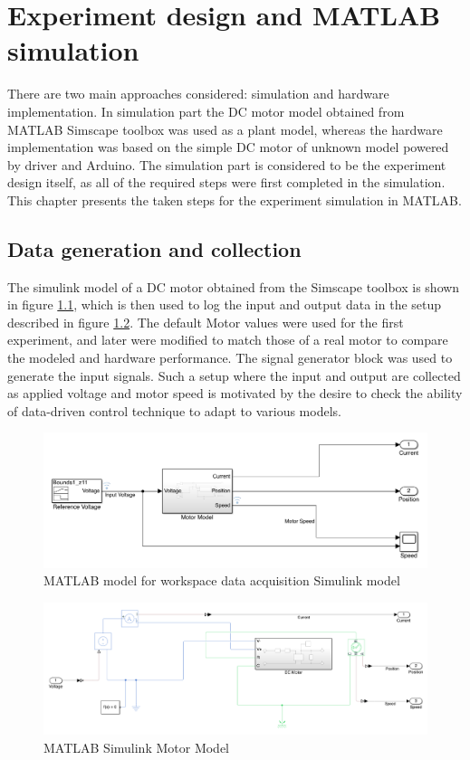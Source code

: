 \documentclass[]{final_report}
\begin{document}
\chapter{Experiment design and MATLAB simulation}

There are two main approaches considered: simulation and hardware implementation. In simulation part the DC motor model obtained from MATLAB Simscape toolbox was used as a plant model, whereas the hardware implementation was based on the simple DC motor of unknown model powered by driver and Arduino. The simulation part is considered to be the experiment design itself, as all of the required steps were first completed in the simulation. This chapter presents the taken steps for the experiment simulation in MATLAB.

\section{Data generation and collection}
The simulink model of a DC motor obtained from the Simscape toolbox is shown in figure \ref{fig:MatlabMotorModelAT1}, which is then used to log the input and output data in the setup described in figure \ref{fig:MatlabMotorModel}. The default Motor values were used for the first experiment, and later were modified to match those of a real motor to compare the modeled and hardware performance. The signal generator block was used to generate the input signals. Such a setup where the input and output are collected as applied voltage and motor speed is motivated by the desire to check the ability of data-driven control technique to adapt to various models. 

\begin{figure} [h!]
\centerline{\includegraphics[width=.85\textwidth]{Screenshots for paper/matlab models/data aq model.png}}
\caption{MATLAB model for workspace data acquisition Simulink model}
\label{fig:MatlabMotorModelAT1}
\end{figure}

\begin{figure} [h!]
\centerline{\includegraphics[width=.85\textwidth]{Screenshots for paper/matlab models/Motor Model.png}}
\caption{MATLAB Simulink Motor Model}
\label{fig:MatlabMotorModel}
\end{figure}
\end{document}
